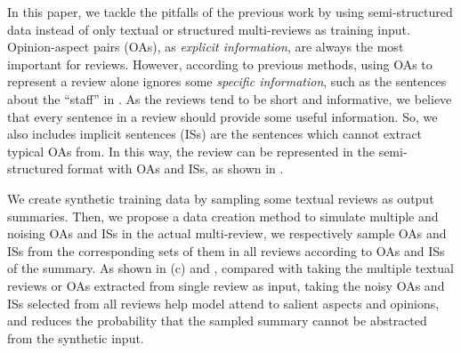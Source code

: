 In this paper, we tackle the pitfalls of the previous
work by using semi-structured data instead of only textual
or structured multi-reviews as training input. 
Opinion-aspect pairs (OAs), as \textit{explicit information},
are always the most important for reviews.
However,
according to previous methods, using OAs to represent a review alone ignores some \textit{specific information},
such as the sentences about the ``staff'' in .
As the reviews tend to be short and informative,
we believe that every sentence in a review should provide some useful information.
So, we also includes implicit sentences (ISs) are the sentences which cannot extract typical OAs from.
In this way, the review can be represented in the semi-structured format with OAs and ISs,
as shown in .

We create synthetic training data by 
sampling some textual reviews as output summaries.
Then, we propose a data creation method to simulate multiple and noising OAs and ISs in the actual multi-review, we respectively sample OAs and ISs from the corresponding sets of them in all reviews according to OAs and ISs of the summary.
As shown in (c) and , compared with taking the multiple textual reviews or OAs extracted from single review as input,
taking the noisy OAs and ISs selected from all reviews help model attend to salient aspects and opinions,
and reduces the probability that the sampled summary cannot be abstracted from the synthetic input.

